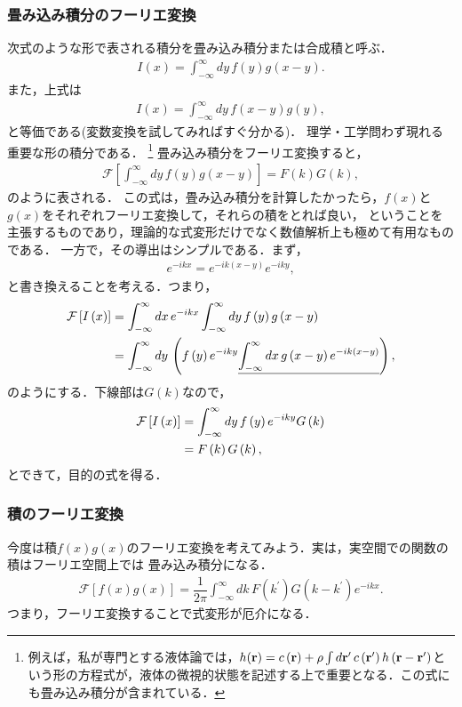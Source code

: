 \subsubsection{畳み込み積分のフーリエ変換}
%
次式のような形で表される積分を畳み込み積分または合成積と呼ぶ．
\begin{align}
 I\left(x\right) = \int_{-\infty}^{\infty}dy\,f\left(y\right)g\left(x-y\right). 
\end{align}
また，上式は
\begin{align}
 I\left(x\right) = \int_{-\infty}^{\infty}dy\,f\left(x-y\right)g\left(y\right),
\end{align}
と等価である(変数変換を試してみればすぐ分かる)．
%
理学・工学問わず現れる重要な形の積分である．
\footnote{例えば，私が専門とする液体論では，$h({\bf r}) = c\left({\bf r}\right) + \rho \int d{\bf r}^{\prime}\,c\left({\bf r}^{\prime}\right)h\left({\bf r}-{\bf r}^{\prime}\right)$という形の方程式が，液体の微視的状態を記述する上で重要となる．この式にも畳み込み積分が含まれている．}
%
畳み込み積分をフーリエ変換すると，
%
\begin{align}
 \mathcal{F}\left[\int_{-\infty}^{\infty}dy\,f\left(y\right)g\left(x-y\right)\right] = F\left(k\right)G\left(k\right),
\end{align}
%
のように表される．
この式は，畳み込み積分を計算したかったら，$f(x)$と$g(x)$をそれぞれフーリエ変換して，それらの積をとれば良い，
ということを主張するものであり，理論的な式変形だけでなく数値解析上も極めて有用なものである．
一方で，その導出はシンプルである．まず，
\begin{align}
 e^{-ikx} = e^{-ik\left(x-y\right)}e^{-iky}, 
\end{align}
%
と書き換えることを考える．つまり，
%
\begin{align}
 \mathcal{F}\left[I\left(x\right)\right]
 &= \int_{-\infty}^{\infty}dx\,e^{-ikx}\int_{-\infty}^{\infty}dy\,f\left(y\right)g\left(x-y\right) \notag \\
 &= \int_{-\infty}^{\infty}dy\,\left(f\left(y\right)e^{-iky} \underline{\int_{-\infty}^{\infty}dx\,g\left(x-y\right)e^{-ik\left(x-y\right)}}\right),
\end{align}
%
のようにする．下線部は$G\left(k\right)$なので，
\begin{align}
 \mathcal{F}\left[I\left(x\right)\right] 
 &= \int_{-\infty}^{\infty}dy\,f\left(y\right)e^{-iky}G\left(k\right)\notag \\
 &= F\left(k\right)G\left(k\right),
\end{align}
とできて，目的の式を得る．
%
%
\subsubsection{積のフーリエ変換}
%
今度は積$f(x)g(x)$のフーリエ変換を考えてみよう．実は，実空間での関数の積はフーリエ空間上では
畳み込み積分になる．
%
\begin{align}
 \mathcal{F}\left[f\left(x\right)g\left(x\right)\right] = \dfrac{1}{2\pi}\int_{-\infty}^{\infty}dk\, 
              F\left(k^{\prime}\right) G\left(k-k^{\prime}\right) e^{-ikx}. 
\end{align}
つまり，フーリエ変換することで式変形が厄介になる．

